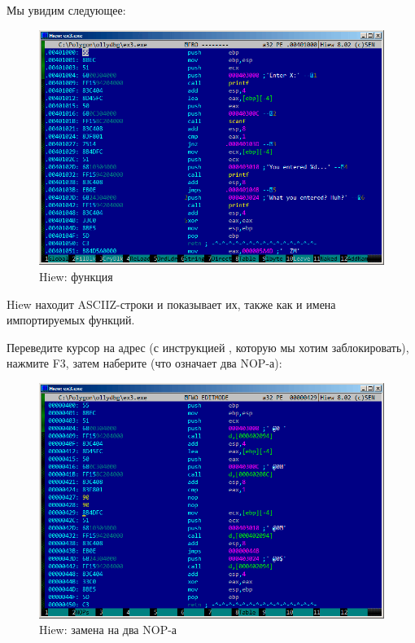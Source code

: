 Мы увидим следующее:

\begin{figure}[H]
\centering
\includegraphics[scale=\FigScale]{patterns/04_scanf/3_checking_retval/hiew_1.png}
\caption{Hiew: функция \main}
\label{fig:scanf_ex3_hiew_1}
\end{figure}

Hiew находит \ac{ASCIIZ}-строки и показывает их, также как и имена импортируемых функций.

\clearpage
Переведите курсор на адрес  (с инструкцией , которую мы хотим заблокировать), нажмите F3, затем наберите  (что означает два \ac{NOP}-а):

\begin{figure}[H]
\centering
\includegraphics[scale=\FigScale]{patterns/04_scanf/3_checking_retval/hiew_2.png}
\caption{Hiew: замена  на два \ac{NOP}-а}
\label{fig:scanf_ex3_hiew_2}
\end{figure}

